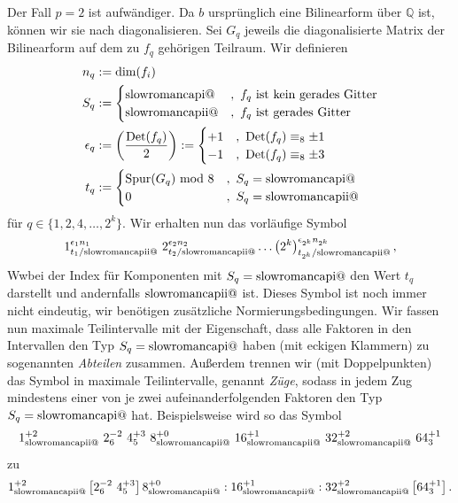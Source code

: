\documentclass[12pt,a4paper,halfparskip,headsepline,bibtotocnumbered]{scrreprt}
\makeatletter
\theoremstyle{nummermitklammern}
\theoremstyle{nonumberbreak}
\newcommand{\Q}{\mathbb{Q}}
\newcommand{\Det}{\text{Det}}
\renewcommand{\i}{\text{\expandafter\@slowromancap\romannumeral 1@}}
\newcommand{\ii}{\text{\expandafter\@slowromancap\romannumeral 2@}}
\makeatother
\begin{document}
Der Fall $p=2$ ist aufwändiger. Da $b$ ursprünglich eine Bilinearform über $\Q$ ist, können wir sie nach \cite[Satz (1.20)]{kneser} diagonalisieren. Sei $G_q$ jeweils die diagonalisierte Matrix der Bilinearform auf dem zu $f_q$ gehörigen Teilraum. Wir definieren
\begin{align*}
	n_q &:= \text{dim}(f_i)\\
	S_q &:= \begin{cases} \i&,\ f_q \text{ ist kein gerades Gitter}\\ \ii &,\ f_q \text{ ist gerades Gitter} \end{cases}\\
	\epsilon_q &:= \left( \frac{\Det(f_q)}{2} \right) := \begin{cases} +1 &,\ \Det(f_q) \equiv_8 \pm 1\\ -1 &,\ \Det(f_q) \equiv_8 \pm 3 \end{cases}\\
	t_q &:= \begin{cases} \text{Spur}(G_q) \text{ mod } 8 &,\ S_q = \i\\ 0 &,\ S_q = \ii\end{cases}
\end{align*}
für $q \in \lbrace 1, 2, 4, \dots, 2^k \rbrace$. Wir erhalten nun das vorläufige Symbol
\begin{equation*}
	1_{t_1 / \ii}^{\epsilon_1 n_1}\ 2_{t_2 / \ii}^{\epsilon_2 n_2} \dots \left( 2^k \right)_{t_{2^k} / \ii}^{\epsilon_{2^k} n_{2^k}},
\end{equation*}
Wwbei der Index für Komponenten mit $S_q = \i$ den Wert $t_q$ darstellt und andernfalls $\ii$ ist. Dieses Symbol ist noch immer nicht eindeutig, wir benötigen zusätzliche Normierungsbedingungen. Wir fassen nun maximale Teilintervalle mit der Eigenschaft, dass alle Faktoren in den Intervallen den Typ $S_q = \i$ haben (mit eckigen Klammern) zu sogenannten \textit{Abteilen} zusammen. Außerdem trennen wir (mit Doppelpunkten) das Symbol in maximale Teilintervalle, genannt \textit{Züge}, sodass in jedem Zug mindestens einer von je zwei aufeinanderfolgenden Faktoren den Typ $S_q = \i$ hat. Beispielsweise wird so das Symbol
\begin{equation}\label{symbol}
	1_{\ii}^{+2}\ 2_6^{-2}\ 4_5^{+3}\ 8_{\ii}^{+0}\ 16_{\ii}^{+1}\ 32_{\ii}^{+2}\ 64_{3}^{+1}
\end{equation}
zu
\begin{equation*}
	1_{\ii}^{+2} \left[ 2_6^{-2}\ 4_5^{+3} \right] 8_{\ii}^{+0} : 16_{\ii}^{+1} : 32_{\ii}^{+2} \left[ 64_{3}^{+1} \right].
\end{equation*}
\end{document}
